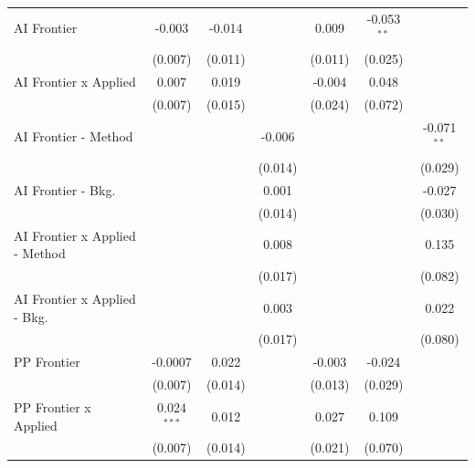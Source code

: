 \begin{tabular}{lcccccc}
   AI Frontier                    & -0.003        & -0.014        &               & 0.009         & -0.053$^{**}$ &   \\   
                                  & (0.007)       & (0.011)       &               & (0.011)       & (0.025)       &   \\   
   AI Frontier x Applied          & 0.007         & 0.019         &               & -0.004        & 0.048         &   \\   
                                  & (0.007)       & (0.015)       &               & (0.024)       & (0.072)       &   \\   
   AI Frontier - Method           &               &               & -0.006        &               &               & -0.071$^{**}$\\   
                                  &               &               & (0.014)       &               &               & (0.029)\\   
   AI Frontier - Bkg.             &               &               & 0.001         &               &               & -0.027\\   
                                  &               &               & (0.014)       &               &               & (0.030)\\   
   AI Frontier x Applied - Method &               &               & 0.008         &               &               & 0.135\\   
                                  &               &               & (0.017)       &               &               & (0.082)\\   
   AI Frontier x Applied - Bkg.   &               &               & 0.003         &               &               & 0.022\\   
                                  &               &               & (0.017)       &               &               & (0.080)\\   
   PP Frontier                    & -0.0007       & 0.022         &               & -0.003        & -0.024        &   \\   
                                  & (0.007)       & (0.014)       &               & (0.013)       & (0.029)       &   \\   
   PP Frontier x Applied          & 0.024$^{***}$ & 0.012         &               & 0.027         & 0.109         &   \\   
                                  & (0.007)       & (0.014)       &               & (0.021)       & (0.070)       &   \\   

\end{tabular}
